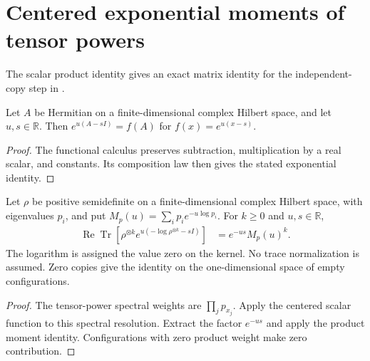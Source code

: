\section{Centered exponential moments of tensor powers}

The scalar product identity gives an exact matrix identity for the
independent-copy step in \cite[Section~8]{OpenAI2026AreaLaw}.

\begin{theorem}
  \label{thm:hermitian_centered_exponential_cfc}
  \leanok
  Let $A$ be Hermitian on a finite-dimensional complex Hilbert space,
  and let $u,s\in\mathbb R$. Then $e^{u(A-sI)}=f(A)$ for
  $f(x)=e^{u(x-s)}$.
\end{theorem}
\begin{proof}
  \leanok
  The functional calculus preserves subtraction, multiplication by a
  real scalar, and constants. Its composition law then gives the
  stated exponential identity.
\end{proof}

\begin{theorem}
  \label{thm:iid_centered_surprisal_exponential}
  \leanok
  Let $\rho$ be positive semidefinite on a finite-dimensional complex
  Hilbert space, with eigenvalues $p_i$, and put
  $M_p(u)=\sum_i p_i e^{-u\log p_i}$. For $k\geq0$ and $u,s\in\mathbb R$,
  \begin{align}
    \operatorname{Re}\operatorname{Tr}\!\left[
      \rho^{\otimes k}e^{u(-\log\rho^{\otimes k}-sI)}\right]
      &=e^{-us}M_p(u)^k.
  \end{align}
  The logarithm is assigned the value zero on the kernel. No trace
  normalization is assumed. Zero copies give the identity on the
  one-dimensional space of empty configurations.
\end{theorem}
\begin{proof}
  \leanok
  The tensor-power spectral weights are $\prod_jp_{x_j}$. Apply the
  centered scalar function to this spectral resolution. Extract the
  factor $e^{-us}$ and apply the product moment identity. Configurations
  with zero product weight make zero contribution.
\end{proof}
